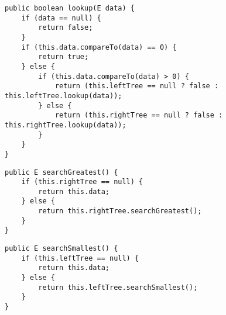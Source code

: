 \begin{Oplossing}{3.5}
\begin{lstlisting}[caption={lookUp(data) methode}, label=bstlookUp]
public boolean lookup(E data) {
	if (data == null) {
		return false;
	}
	if (this.data.compareTo(data) == 0) {
		return true;
	} else {
		if (this.data.compareTo(data) > 0) {
			return (this.leftTree == null ? false : this.leftTree.lookup(data));
		} else {
			return (this.rightTree == null ? false : this.rightTree.lookup(data));
		}
	}
}
\end{lstlisting}
\end{Oplossing}
\begin{Oplossing}{3.6}
\begin{lstlisting}[caption={searchGreatest methode}, label=bstsearchgreatest]
public E searchGreatest() {
	if (this.rightTree == null) {
		return this.data;
	} else {
		return this.rightTree.searchGreatest();
	}
}
 \end{lstlisting}

\end{Oplossing}
\begin{Oplossing}{3.7}
\begin{lstlisting}[caption={searchSmallest methode}, label=bstsearchsmallest]
public E searchSmallest() {
	if (this.leftTree == null) {
		return this.data;
	} else {
		return this.leftTree.searchSmallest();
	}
}
\end{lstlisting}
\end{Oplossing}
